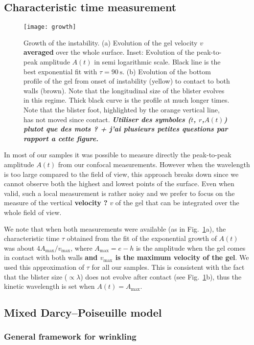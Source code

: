 \documentclass[twocolumn,superscriptaddress,showpacs,preprintnumbers,
amsmath,amssymb,prl]{revtex4-1}
\newcommand{\seb}[1]{\textbf{\color{blue}#1}} %
\begin{document}
\subsection*{Characteristic time measurement}
\begin{figure}
	\texttt{[image: growth]}
	\caption{Growth of the instability. (a) Evolution of the gel velocity $v$ \seb{averaged} over the whole surface. Inset: Evolution of the peak-to-peak amplitude $A(t)$ in semi logarithmic scale. Black line is the best exponential fit with $\tau=\SI{90}{\second}$. (b) Evolution of the bottom profile of the gel from onset of instability (yellow) to contact to both walls (brown). Note that the longitudinal size of the blister evolves in this regime. Thick black curve is the profile at much longer times. Note that the blister foot, highlighted by the orange vertical line, has not moved since contact. \seb{\it Utiliser des symboles ($t$, $r$,$ A(t)$) plutot que des mots ? + j'ai plusieurs petites questions par rapport a cette figure.}}
	\label{fig:growth}
\end{figure}

In most of our samples it was possible to measure directly the peak-to-peak amplitude $A(t)$ from our confocal measurements. However when the wavelength is too large compared to the field of view, this approach breaks down since we cannot observe both the highest and lowest points of the surface. Even when valid, such a local measurement is rather noisy and we prefer to focus on the measure of the vertical \seb{velocity ?} $v$ of the gel that can be integrated over the whole field of view.

We note that when both measurements were available (as in Fig.~\ref{fig:growth}a), the characteristic time $\tau$ obtained from the fit of the exponential growth of $A(t)$ was about $4A_\text{max}/v_\text{max}$, where $A_\text{max} = e-h$ is the amplitude when the gel comes in contact with both walls \seb{and $v_\text{max}$ is the maximum velocity of the gel}. We used this approximation of $\tau$ for all our samples. This is consistent with the fact that the blister size ($\propto\lambda$) does not evolve after contact (see Fig.~\ref{fig:growth}b), thus the kinetic wavelength is set when $A(t) = A_\text{max}$.

\subsection*{Mixed Darcy--Poiseuille model}

\subsubsection*{General framework for wrinkling}
\end{document}

